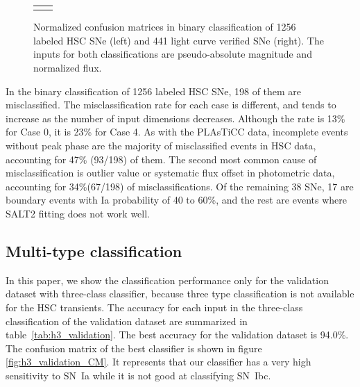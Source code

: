 \documentclass[useamsfonts]{pasj01}
\begin{document}
\begin{figure}[htbp]
\begin{tabular}{cc}
\begin{minipage}{0.5\hsize}
\begin{center}
            \end{center}
        \end{minipage}
    \end{tabular}
    \caption{%
  Normalized confusion matrices in binary classification of 1256 labeled HSC SNe (left) and 441 light curve verified SNe (right).
  The inputs for both classifications are pseudo-absolute magnitude and normalized flux.
}%
    \label{fig:h2_test_CM}
\end{figure}
%

In the binary classification of 1256 labeled HSC SNe, 198 of them are misclassified.
The misclassification rate for each case is different, and tends to increase as the number of input dimensions decreases.
Although the rate is 13\% for Case 0, it is 23\% for Case 4.
As with the PLAsTiCC data, incomplete events without peak phase are the majority of misclassified events in HSC data, accounting for 47\% (93/198) of them.
The second most common cause of misclassification is outlier value or systematic flux offset in photometric data, accounting for 34\%(67/198) of misclassifications.
Of the remaining 38 SNe, 17 are boundary events with Ia probability of 40 to 60\%, and the rest are events where SALT2 fitting does not work well.

%
%
\subsection{Multi-type classification}
\label{sec:h3}
%
In this paper, we show the classification performance only for the validation dataset with three-class classifier, because three type classification is not available for the HSC transients.
%
The accuracy for each input in the three-class classification of the validation dataset are summarized in table\ \ref{tab:h3_validation}.
The best accuracy for the validation dataset is 94.0\%.
The confusion matrix of the best classifier is shown in figure \ref{fig:h3_validation_CM}.
It represents that our classifier has a very high sensitivity to SN~Ia while it is not good at classifying SN~Ibc.
\end{document}
